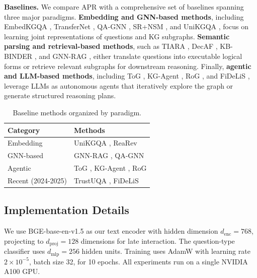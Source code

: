 \documentclass[conference]{IEEEtran}
\newcommand{\model}{\textsc{APR}}
\begin{document}
\textbf{Baselines.} We compare \model{} with a comprehensive set of baselines spanning three major paradigms. \textbf{Embedding and GNN-based methods}, including EmbedKGQA \cite{saxena2020embedkgqa}, TransferNet \cite{shi2021transfernet}, QA-GNN \cite{yasunaga2021qagnn}, SR+NSM \cite{zhang2022srnsm}, and UniKGQA \cite{jiang2023unikgqa}, focus on learning joint representations of questions and KG subgraphs. \textbf{Semantic parsing and retrieval-based methods}, such as TIARA \cite{shu2022tiara}, DecAF \cite{yu2023decaf}, KB-BINDER \cite{li2023kbbinder}, and GNN-RAG \cite{mavromatis2024gnnrag}, either translate questions into executable logical forms or retrieve relevant subgraphs for downstream reasoning. Finally, \textbf{agentic and LLM-based methods}, including ToG \cite{sun2024tog}, KG-Agent \cite{jiang2024kgagent}, RoG \cite{luo2024rog}, and FiDeLiS \cite{sui2025fidelis}, leverage LLMs as autonomous agents that iteratively explore the graph or generate structured reasoning plans.

\begin{table}[t]
\centering
\caption{Baseline methods organized by paradigm.}
\label{tab:baselines}
\begin{tabular}{ll}
\toprule
Category & Methods \\
\midrule
Embedding & UniKGQA \cite{jiang2023unikgqa}, ReaRev \cite{luo2022rearev} \\
GNN-based & GNN-RAG \cite{mavromatis2024gnnrag}, QA-GNN \cite{yasunaga2021qagnn} \\
Agentic & ToG \cite{sun2024tog}, KG-Agent \cite{jiang2024kgagent}, RoG \cite{luo2024rog} \\
Recent (2024-2025) & TrustUQA \cite{zhang2024trustuqa}, FiDeLiS \cite{sui2025fidelis} \\
\bottomrule
\end{tabular}
\end{table}

\subsection{Implementation Details}

We use BGE-base-en-v1.5 \cite{xiao2024bge} as our text encoder with hidden dimension $d_{\text{enc}} = 768$, projecting to $d_{\text{proj}} = 128$ dimensions for late interaction. The question-type classifier uses $d_{\text{mlp}} = 256$ hidden units. Training uses AdamW \cite{loshchilov2019adamw} with learning rate $2 \times 10^{-5}$, batch size 32, for 10 epochs. All experiments run on a single NVIDIA A100 GPU.
\end{document}
